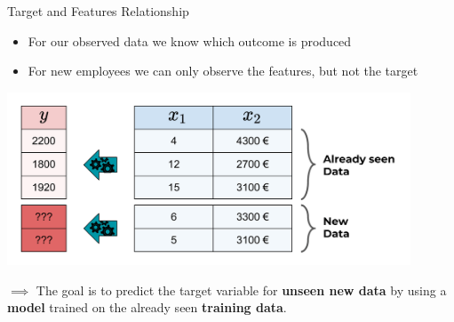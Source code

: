 \documentclass[11pt,compress,t,notes=noshow, xcolor=table]{beamer}
\begin{document}
\begin{frame}{Target and Features Relationship}

\begin{itemize}
\item For our observed data we know which outcome is produced
\item For new employees we can only observe the features, but not the target
\end{itemize}

\vspace{-0.5cm}

\scriptsize

\begin{center}\includegraphics[width=0.9\textwidth]{figure_man/new_data1_web} \end{center}

\normalsize

\vspace{-0.5cm}

\(\implies\) The goal is to predict the target variable for
\textbf{unseen new data} by using a \textbf{model} trained on the
already seen \textbf{training data}.\\

\end{frame}
\end{document}
